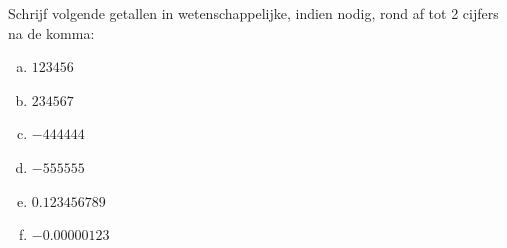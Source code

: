 \documentclass[12pt,twoside,a4paper]{article}
\begin{document}
\begin{oefening}
  Schrijf volgende getallen in wetenschappelijke, indien nodig, rond af tot 2 cijfers na de komma:
  \begin{multicols}{3}
    \begin{enumerate}[(a)]
    \item $123456$
    \item $234567$
    \item $-444444$
    \item $-555555$
    \item $0.123456789$
    \item $-0.00000123$
    \end{enumerate}
  \end{multicols}
\end{oefening}
\end{document}
